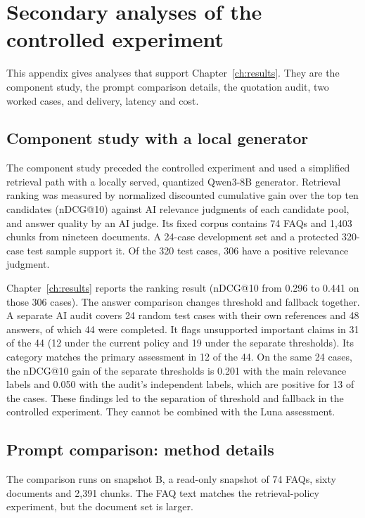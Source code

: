 \section{Secondary analyses of the controlled experiment}
\label{app:secondary}

This appendix gives analyses that support Chapter~\ref{ch:results}. They are the component study, the prompt comparison details, the quotation audit, two worked cases, and delivery, latency and cost.

\subsection{Component study with a local generator}
\label{sec:component-study}

The component study preceded the controlled experiment and used a simplified retrieval path with a locally served, quantized Qwen3-8B generator. Retrieval ranking was measured by normalized discounted cumulative gain over the top ten candidates (nDCG@10) against AI relevance judgments of each candidate pool, and answer quality by an AI judge. Its fixed corpus contains 74 FAQs and 1,403 chunks from nineteen documents. A 24-case development set and a protected 320-case test sample support it. Of the 320 test cases, 306 have a positive relevance judgment.

Chapter~\ref{ch:results} reports the ranking result (nDCG@10 from 0.296 to 0.441 on those 306 cases). The answer comparison changes threshold and fallback together. A separate AI audit covers 24 random test cases with their own references and 48 answers, of which 44 were completed. It flags unsupported important claims in 31 of the 44 (12 under the current policy and 19 under the separate thresholds). Its category matches the primary assessment in 12 of the 44. On the same 24 cases, the nDCG@10 gain of the separate thresholds is 0.201 with the main relevance labels and 0.050 with the audit's independent labels, which are positive for 13 of the cases. These findings led to the separation of threshold and fallback in the controlled experiment. They cannot be combined with the Luna assessment.

\subsection{Prompt comparison: method details}
\label{sec:prompt-method-details}

The comparison runs on snapshot B, a read-only snapshot of 74 FAQs, sixty documents and 2,391 chunks. The FAQ text matches the retrieval-policy experiment, but the document set is larger.

